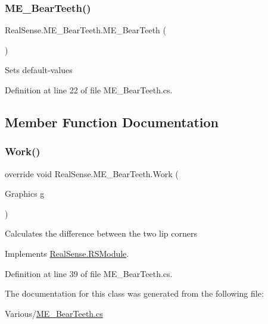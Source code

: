 \subsubsection{\texorpdfstring{M\+E\+\_\+\+Bear\+Teeth()}{ME\_BearTeeth()}}
{\footnotesize\ttfamily Real\+Sense.\+M\+E\+\_\+\+Bear\+Teeth.\+M\+E\+\_\+\+Bear\+Teeth (\begin{DoxyParamCaption}{ }\end{DoxyParamCaption})}

Sets default-\/values 

Definition at line 22 of file M\+E\+\_\+\+Bear\+Teeth.\+cs.



\subsection{Member Function Documentation}
\mbox{\label{class_real_sense_1_1_m_e___bear_teeth_a2e4cc340fec3499318fa7514ee7f1822}} 
\subsubsection{\texorpdfstring{Work()}{Work()}}
{\footnotesize\ttfamily override void Real\+Sense.\+M\+E\+\_\+\+Bear\+Teeth.\+Work (\begin{DoxyParamCaption}\item[{Graphics}]{g }\end{DoxyParamCaption})\hspace{0.3cm}{\ttfamily [virtual]}}

Calculates the difference between the two lip corners 

Implements \hyperlink{class_real_sense_1_1_r_s_module_a2ec830b7932ee7c0077d473f81c73867}{Real\+Sense.\+R\+S\+Module}.



Definition at line 39 of file M\+E\+\_\+\+Bear\+Teeth.\+cs.



The documentation for this class was generated from the following file\+:\begin{DoxyCompactItemize}
\item 
Various/\hyperlink{_m_e___bear_teeth_8cs}{M\+E\+\_\+\+Bear\+Teeth.\+cs}\end{DoxyCompactItemize}
